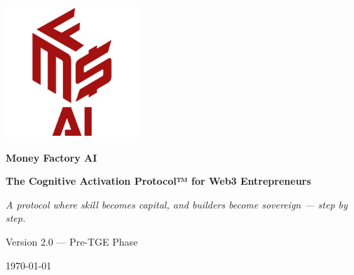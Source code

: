 
\thispagestyle{empty}


\vspace*{1.5cm}

\begin{center}
  \includegraphics[width=5cm]{images/logo.png}

  \vspace{1.5cm}
  {\Huge\bfseries\color{white} Money Factory AI}

  \vspace{0.5cm}
  {\Large\bfseries\color{white} The Cognitive Activation Protocol™ for Web3 Entrepreneurs}

  \vspace{1.2cm}
  \begin{minipage}{0.8\textwidth}
    \centering
    \Large\itshape\color{white}
    A protocol where skill becomes capital, and builders become sovereign — step by step.
  \end{minipage}

  \vfill

  {\color{white}\large Version 2.0 — Pre-TGE Phase}

  \vspace{0.2cm}
  {\color{white} \today}

  \vspace{1cm}
\end{center}

\newpage
